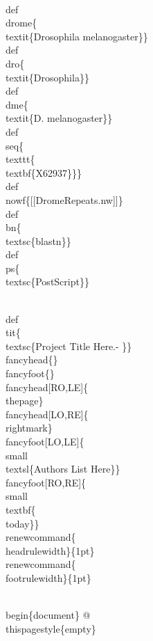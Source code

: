 \documentclass[11pt]{article}
\renewcommand{\headrulewidth}{1pt}
\renewcommand{\footrulewidth}{1pt}
\begin{document}
\\def\\drome\{\\textit\{Drosophila melanogaster\}\}
\\def\\dro\{\\textit\{Drosophila\}\}
\\def\\dme\{\\textit\{D. melanogaster\}\}
\\def\\seq\{\\texttt\{\\textbf\{X62937\}\}\}
\\def\\nowf\{[[DromeRepeats.nw]]\}
\\def\\bn\{\\textsc\{blastn\}\}
\\def\\ps\{\\textsc\{PostScript\}\}


\\def\\tit\{\\textsc\{Project Title Here.- \}\}
\\fancyhead\{\} %
\\fancyfoot\{\} %
\\fancyhead[RO,LE]\{\\thepage\}
\\fancyhead[LO,RE]\{\\rightmark\}
\\fancyfoot[LO,LE]\{\\small\\textsl\{Authors List Here\}\}
\\fancyfoot[RO,RE]\{\\small\\textbf\{\\today\}\}
\\renewcommand\{\\headrulewidth\}\{1pt\}
\\renewcommand\{\\footrulewidth\}\{1pt\}


\\begin\{document\}
@ 
\\thispagestyle\{empty\}
\end{document}
